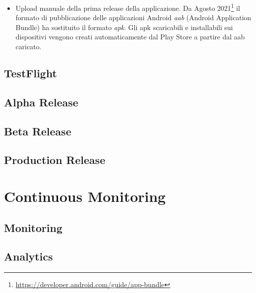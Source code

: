 \begin{itemize}
\begin{itemize}
        \begin{listing}[H]
        \inputminted{bash}{code/4-jks}
        \caption{Creazione, codifica e decodifica della chiave JKS}
        \end{listing}
    \end{itemize}
    \item Upload manuale della prima release della applicazione. Da Agosto 2021\footnote{\url{https://developer.android.com/guide/app-bundle}} il formato di pubblicazione delle applicazioni Android \textit{aab} (Android Application Bundle) ha sostituito il formato \textit{apk}. Gli apk scaricabili e installabili sui dispositivi vengono creati automaticamente dal Play Store a partire dal aab caricato.
\end{itemize}

\subsection{TestFlight}

\subsection{Alpha Release}

\subsection{Beta Release}

\subsection{Production Release}

\section{Continuous Monitoring}
\subsection{Monitoring}
\subsection{Analytics}

